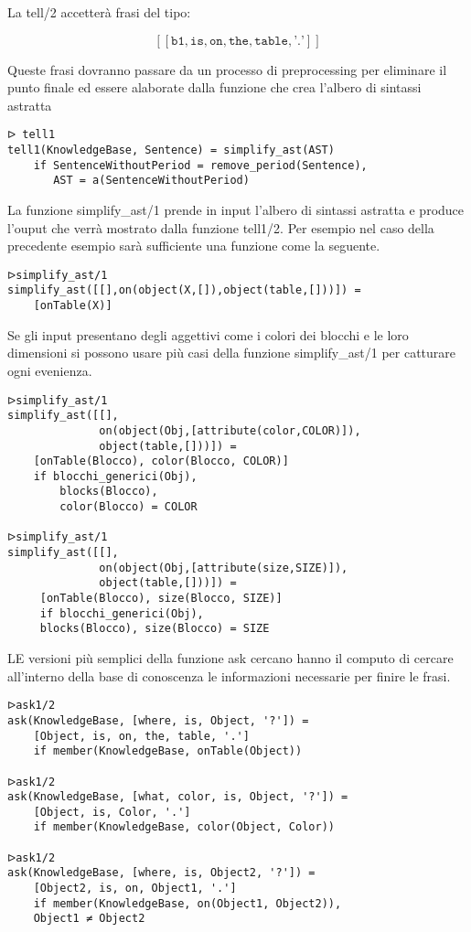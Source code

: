 \documentclass[12pt,twoside]{report}
\begin{document}
La tell/2 accetterà frasi del tipo:

\[
[[ \texttt{b1}, \texttt{is}, \texttt{on}, \texttt{the}, \texttt{table}, \texttt{'.'} ]]
\]



Queste frasi dovranno passare da un processo di preprocessing per eliminare il punto finale ed essere alaborate dalla funzione che crea l'albero di sintassi astratta

\begin{lstlisting}
ᐅ tell1
tell1(KnowledgeBase, Sentence) = simplify_ast(AST)
    if SentenceWithoutPeriod = remove_period(Sentence),
       AST = a(SentenceWithoutPeriod)
\end{lstlisting}

La funzione simplify\_ast/1 prende in input l'albero di sintassi astratta e produce l'ouput che verrà mostrato dalla funzione tell1/2. Per esempio nel caso della precedente esempio sarà sufficiente una funzione come la seguente.

\begin{lstlisting}
ᐅsimplify_ast/1
simplify_ast([[],on(object(X,[]),object(table,[]))]) = 
    [onTable(X)]
\end{lstlisting}

Se gli input presentano degli aggettivi come i colori dei blocchi e le loro dimensioni si possono usare più casi della funzione simplify\_ast/1 per catturare ogni evenienza.

\begin{lstlisting}
ᐅsimplify_ast/1
simplify_ast([[],
              on(object(Obj,[attribute(color,COLOR)]),
              object(table,[]))]) = 
    [onTable(Blocco), color(Blocco, COLOR)]
    if blocchi_generici(Obj),  
        blocks(Blocco), 
        color(Blocco) = COLOR
        
ᐅsimplify_ast/1
simplify_ast([[],
              on(object(Obj,[attribute(size,SIZE)]),
              object(table,[]))]) = 
     [onTable(Blocco), size(Blocco, SIZE)]
     if blocchi_generici(Obj),  
     blocks(Blocco), size(Blocco) = SIZE
\end{lstlisting}

LE versioni più semplici della funzione ask cercano hanno il computo di cercare all'interno della base di conoscenza le informazioni necessarie per finire le frasi.

\begin{lstlisting}
ᐅask1/2
ask(KnowledgeBase, [where, is, Object, '?']) = 
    [Object, is, on, the, table, '.']
    if member(KnowledgeBase, onTable(Object))

ᐅask1/2
ask(KnowledgeBase, [what, color, is, Object, '?']) = 
    [Object, is, Color, '.']
    if member(KnowledgeBase, color(Object, Color))

ᐅask1/2
ask(KnowledgeBase, [where, is, Object2, '?']) = 
    [Object2, is, on, Object1, '.']
    if member(KnowledgeBase, on(Object1, Object2)), 
    Object1 ≠ Object2
\end{lstlisting}
\end{document}
